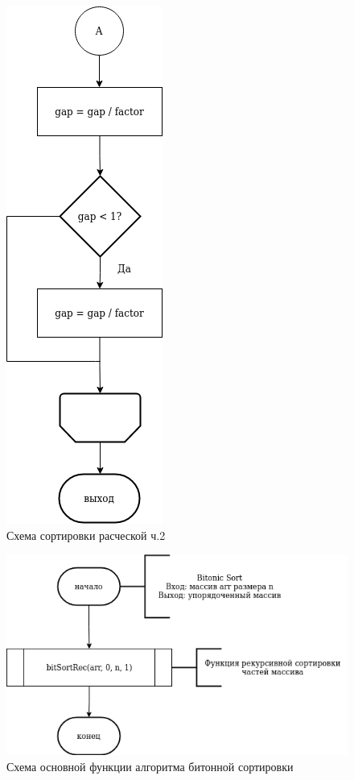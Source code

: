 \documentclass[12pt]{report}
\begin{document}
	\begin{figure}[h]
		\centering
		\includegraphics{combSort_2}
		\caption{Схема сортировки расческой ч.2}
		\label{fig:schema_selection}
	\end{figure}
	
	\begin{figure}[h]
		\centering
		\includegraphics{bitonic_1}
		\caption{Схема основной функции алгоритма битонной сортировки}
		\label{fig:schema_insertion}
	\end{figure}
	
\end{document}
